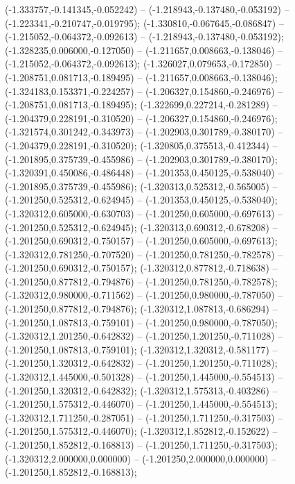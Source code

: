  (-1.333757,-0.141345,-0.052242) -- (-1.218943,-0.137480,-0.053192) -- (-1.223341,-0.210747,-0.019795);
 (-1.330810,-0.067645,-0.086847) -- (-1.215052,-0.064372,-0.092613) -- (-1.218943,-0.137480,-0.053192);
 (-1.328235,0.006000,-0.127050) -- (-1.211657,0.008663,-0.138046) -- (-1.215052,-0.064372,-0.092613);
 (-1.326027,0.079653,-0.172850) -- (-1.208751,0.081713,-0.189495) -- (-1.211657,0.008663,-0.138046);
 (-1.324183,0.153371,-0.224257) -- (-1.206327,0.154860,-0.246976) -- (-1.208751,0.081713,-0.189495);
 (-1.322699,0.227214,-0.281289) -- (-1.204379,0.228191,-0.310520) -- (-1.206327,0.154860,-0.246976);
 (-1.321574,0.301242,-0.343973) -- (-1.202903,0.301789,-0.380170) -- (-1.204379,0.228191,-0.310520);
 (-1.320805,0.375513,-0.412344) -- (-1.201895,0.375739,-0.455986) -- (-1.202903,0.301789,-0.380170);
 (-1.320391,0.450086,-0.486448) -- (-1.201353,0.450125,-0.538040) -- (-1.201895,0.375739,-0.455986);
 (-1.320313,0.525312,-0.565005) -- (-1.201250,0.525312,-0.624945) -- (-1.201353,0.450125,-0.538040);
 (-1.320312,0.605000,-0.630703) -- (-1.201250,0.605000,-0.697613) -- (-1.201250,0.525312,-0.624945);
 (-1.320313,0.690312,-0.678208) -- (-1.201250,0.690312,-0.750157) -- (-1.201250,0.605000,-0.697613);
 (-1.320312,0.781250,-0.707520) -- (-1.201250,0.781250,-0.782578) -- (-1.201250,0.690312,-0.750157);
 (-1.320312,0.877812,-0.718638) -- (-1.201250,0.877812,-0.794876) -- (-1.201250,0.781250,-0.782578);
 (-1.320312,0.980000,-0.711562) -- (-1.201250,0.980000,-0.787050) -- (-1.201250,0.877812,-0.794876);
 (-1.320312,1.087813,-0.686294) -- (-1.201250,1.087813,-0.759101) -- (-1.201250,0.980000,-0.787050);
 (-1.320312,1.201250,-0.642832) -- (-1.201250,1.201250,-0.711028) -- (-1.201250,1.087813,-0.759101);
 (-1.320312,1.320312,-0.581177) -- (-1.201250,1.320312,-0.642832) -- (-1.201250,1.201250,-0.711028);
 (-1.320312,1.445000,-0.501328) -- (-1.201250,1.445000,-0.554513) -- (-1.201250,1.320312,-0.642832);
 (-1.320312,1.575313,-0.403286) -- (-1.201250,1.575312,-0.446070) -- (-1.201250,1.445000,-0.554513);
 (-1.320312,1.711250,-0.287051) -- (-1.201250,1.711250,-0.317503) -- (-1.201250,1.575312,-0.446070);
 (-1.320312,1.852812,-0.152622) -- (-1.201250,1.852812,-0.168813) -- (-1.201250,1.711250,-0.317503);
 (-1.320312,2.000000,0.000000) -- (-1.201250,2.000000,0.000000) -- (-1.201250,1.852812,-0.168813);
